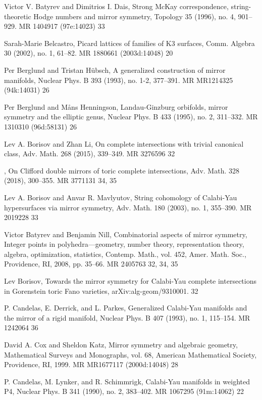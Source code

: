 {\begin{list}{}{%
  \setlength{\leftmargin}{3.8em}%
  \setlength{\itemindent}{-3.8em}%
  \setlength{\itemsep}{1.5pt}%
  \setlength{\parsep}{0pt}%
  \setlength{\listparindent}{0pt}%
}
\item[{[BD96]}] Victor V. Batyrev and Dimitrios I. Dais, Strong McKay correspondence, string-theoretic Hodge numbers and mirror symmetry, Topology 35 (1996), no. 4, 901--929. MR 1404917 (97e:14023) 33
\item[{[Bel02]}] Sarah-Marie Belcastro, Picard lattices of families of K3 surfaces, Comm. Algebra 30 (2002), no. 1, 61--82. MR 1880661 (2003d:14048) 20
\item[{[BH93]}] Per Berglund and Tristan Hübsch, A generalized construction of mirror manifolds, Nuclear Phys. B 393 (1993), no. 1-2, 377--391. MR MR1214325 (94k:14031) 26
\item[{[BH95]}] Per Berglund and Måns Henningson, Landau-Ginzburg orbifolds, mirror symmetry and the elliptic genus, Nuclear Phys. B 433 (1995), no. 2, 311--332. MR 1310310 (96d:58131) 26
\item[{[BL15]}] Lev A. Borisov and Zhan Li, On complete intersections with trivial canonical class, Adv. Math. 268 (2015), 339--349. MR 3276596 32
\item[{[BL18]}] , On Clifford double mirrors of toric complete intersections, Adv. Math. 328 (2018), 300--355. MR 3771131 34, 35
\item[{[BM03]}] Lev A. Borisov and Anvar R. Mavlyutov, String cohomology of Calabi-Yau hypersurfaces via mirror symmetry, Adv. Math. 180 (2003), no. 1, 355--390. MR 2019228 33
\item[{[BN08]}] Victor Batyrev and Benjamin Nill, Combinatorial aspects of mirror symmetry, Integer points in polyhedra---geometry, number theory, representation theory, algebra, optimization, statistics, Contemp. Math., vol. 452, Amer. Math. Soc., Providence, RI, 2008, pp. 35--66. MR 2405763 32, 34, 35
\item[{[Bor]}] Lev Borisov, Towards the mirror symmetry for Calabi-Yau complete intersections in Gorenstein toric Fano varieties, arXiv:alg-geom/9310001. 32
\item[{[CDP93]}] P. Candelas, E. Derrick, and L. Parkes, Generalized Calabi-Yau manifolds and the mirror of a rigid manifold, Nuclear Phys. B 407 (1993), no. 1, 115--154. MR 1242064 36
\item[{[CK99]}] David A. Cox and Sheldon Katz, Mirror symmetry and algebraic geometry, Mathematical Surveys and Monographs, vol. 68, American Mathematical Society, Providence, RI, 1999. MR MR1677117 (2000d:14048) 28
\item[{[CLS90]}] P. Candelas, M. Lynker, and R. Schimmrigk, Calabi-Yau manifolds in weighted P4, Nuclear Phys. B 341 (1990), no. 2, 383--402. MR 1067295 (91m:14062) 22

\end{list}}
